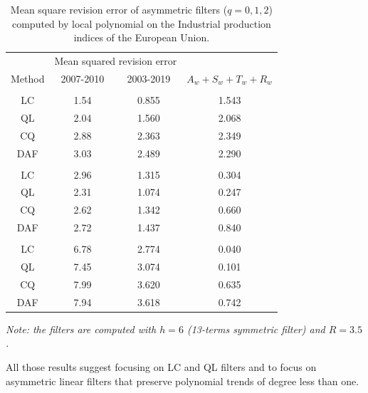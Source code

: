 \documentclass[
  12pt,
  ,
  a4paper]{article}
\newcommand\1{\mathds{1}}
\begin{document}
\begin{table}[!htb]
\caption{\label{tab:mseIPI}Mean square revision error of asymmetric filters ($q=0,1,2$) computed by local polynomial on the Industrial production indices of the European Union.}
\centering
\begin{tabular}[t]{cccc}
\toprule
\multicolumn{1}{c}{ } & \multicolumn{2}{c}{Mean squared revision error} & \multicolumn{1}{c}{ } \\
\cmidrule(l{3pt}r{3pt}){2-3}
Method & 2007-2010 & 2003-2019 & $A_w+S_w+T_w+R_w$\\
\midrule
\addlinespace[0.3em]
\multicolumn{4}{l}{$q=0$}\\
\hspace{1em}LC & 1.54 & 0.855 & 1.543\\
\hspace{1em}QL & 2.04 & 1.560 & 2.068\\
\hspace{1em}CQ & 2.88 & 2.363 & 2.349\\
\hspace{1em}DAF & 3.03 & 2.489 & 2.290\\
\addlinespace[0.3em]
\multicolumn{4}{l}{$q=1$}\\
\hspace{1em}LC & 2.96 & 1.315 & 0.304\\
\hspace{1em}QL & 2.31 & 1.074 & 0.247\\
\hspace{1em}CQ & 2.62 & 1.342 & 0.660\\
\hspace{1em}DAF & 2.72 & 1.437 & 0.840\\
\addlinespace[0.3em]
\multicolumn{4}{l}{$q=2$}\\
\hspace{1em}LC & 6.78 & 2.774 & 0.040\\
\hspace{1em}QL & 7.45 & 3.074 & 0.101\\
\hspace{1em}CQ & 7.99 & 3.620 & 0.635\\
\hspace{1em}DAF & 7.94 & 3.618 & 0.742\\
\bottomrule
\end{tabular}

\emph{Note: the filters are computed with $h=6$ (13-terms symmetric filter) and $R=3.5$.}
\end{table}

\faArrowCircleRight{} All those results suggest focusing on LC and QL filters and to focus on asymmetric linear filters that preserve polynomial trends of degree less than one.
\end{document}
